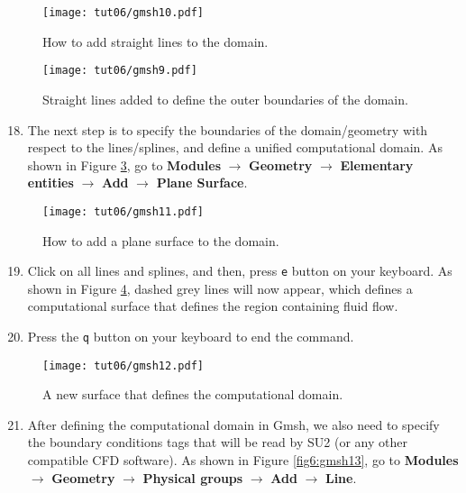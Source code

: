 \begin{figure}[ht]
    \centering
    \texttt{[image: tut06/gmsh10.pdf]}
    \caption{How to add straight lines to the domain.}
    \label{fig6:gmsh10}
\end{figure}
\begin{figure}[ht]
    \centering
    \texttt{[image: tut06/gmsh9.pdf]}
    \caption{Straight lines added to define the outer boundaries of the domain.}
    \label{fig6:gmsh9}
\end{figure}
\begin{enumerate}[label=\arabic*)]
	\setcounter{enumi}{17}
	\item The next step is to specify the boundaries of the domain/geometry with respect to the lines/splines, and define a unified computational domain. As shown in Figure  \ref{fig6:gmsh11}, go to \textbf{Modules} $\rightarrow$ \textbf{Geometry} $\rightarrow$ \textbf{Elementary entities} $\rightarrow$ \textbf{Add} $\rightarrow$ \textbf{Plane Surface}.
\end{enumerate}
\begin{figure}[H]
    \centering
    \texttt{[image: tut06/gmsh11.pdf]}
    \caption{How to add a plane surface to the domain.}
    \label{fig6:gmsh11}
\end{figure}
\begin{enumerate}[label=\arabic*)]
	\setcounter{enumi}{18}
	\item Click on all lines and splines, and then, press \texttt{e} button on your keyboard. As shown in Figure \ref{fig6:gmsh12}, dashed grey lines will now appear, which defines a computational surface that defines the region containing fluid flow.
	\item Press the \texttt{q} button on your keyboard to end the command.
\end{enumerate}
\begin{figure}[ht]
    \centering
    \texttt{[image: tut06/gmsh12.pdf]}
    \caption{A new surface that defines the computational domain.}
    \label{fig6:gmsh12}
\end{figure}
\begin{enumerate}[label=\arabic*)]
	\setcounter{enumi}{20}
	\item After defining the computational domain in Gmsh, we also need to specify the boundary conditions tags that will be read by SU2 (or any other compatible CFD software). As shown in Figure \ref{fig6:gmsh13}, go to \textbf{Modules} $\rightarrow$ \textbf{Geometry} $\rightarrow$ \textbf{Physical groups} $\rightarrow$ \textbf{Add} $\rightarrow$ \textbf{Line}.
\end{enumerate}
